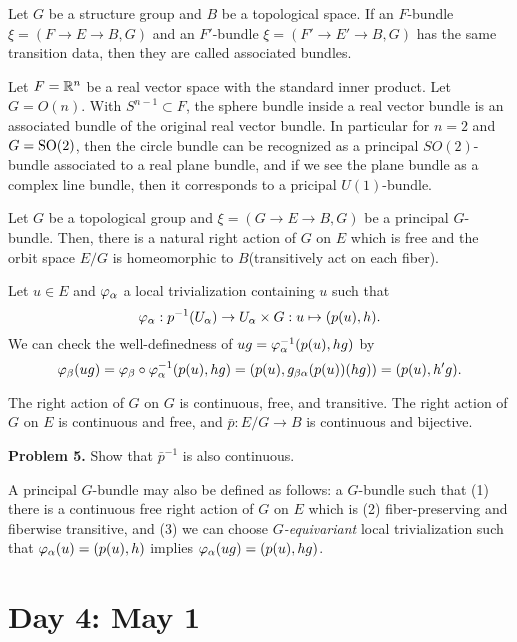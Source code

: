 \documentclass{../../../small}
\begin{document}
\begin{defn}
Let $G$ be a structure group and $B$ be a topological space.
If an $F$-bundle $\xi=(F\to E\to B,G)$ and an $F'$-bundle $\xi=(F'\to E'\to B,G)$ has the same transition data, then they are called associated bundles.
\end{defn}


\begin{ex*}
Let $F=\mathbb{R}^n$ be a real vector space with the standard inner product.
Let $G=O(n)$.
With $S^{n-1}\subset F$, the sphere bundle inside a real vector bundle is an associated bundle of the original real vector bundle.
In particular for $n=2$ and $G=\mathrm{SO}(2)$, then the circle bundle can be recognized as a principal $SO(2)$-bundle associated to a real plane bundle, and if we see the plane bundle as a complex line bundle, then it corresponds to a pricipal $U(1)$-bundle.
\end{ex*}

\begin{prop}
Let $G$ be a topological group and $\xi=(G\to E\to B,G)$ be a principal $G$-bundle.
Then, there is a natural right action of $G$ on $E$ which is free and the orbit space $E/G$ is homeomorphic to $B$(transitively act on each fiber).
\end{prop}
\begin{pf}
Let $u\in E$ and $\varphi_\alpha$ a local trivialization containing $u$ such that
\[\varphi_\alpha:p^{-1}(U_\alpha)\to U_\alpha\times G:u\mapsto(p(u),h).\]
We can check the well-definedness of $ug=\varphi_\alpha^{-1}(p(u),hg)$ by
\[\varphi_\beta(ug)=\varphi_\beta\circ\varphi_\alpha^{-1}(p(u),hg)=(p(u),g_{\beta\alpha}(p(u))(hg))=(p(u),h'g).\]

The right action of $G$ on $G$ is continuous, free, and transitive.
The right action of $G$ on $E$ is continuous and free, and $\bar p:E/G\to B$ is continuous and bijective.
\end{pf}

\textbf{Problem 5.} Show that $\bar{p}^{-1}$ is also continuous.

\begin{rmk*}
A principal $G$-bundle may also be defined as follows: a $G$-bundle such that (1) there is a continuous free right action of $G$ on $E$ which is (2) fiber-preserving and fiberwise transitive, and (3) we can choose \emph{$G$-equivariant} local trivialization such that $\varphi_\alpha(u)=(p(u),h)$ implies $\varphi_\alpha(ug)=(p(u),hg)$.
\end{rmk*}

\newpage
\setcounter{section}{3}
\section{Day 4: May 1}
\setcounter{section}{2}
\setcounter{thm}{7}
\end{document}
